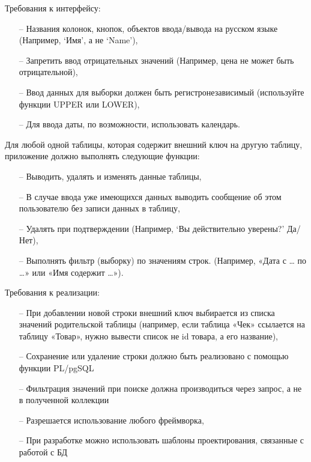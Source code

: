 \documentclass[a4paper,14pt]{extarticle}
\begin{document}
  Требования к интерфейсу:
  \begin{itemize}
    \item[--] Названия колонок, кнопок, объектов ввода/вывода на русском языке (Например, ‘Имя’, а не ‘Name’),
    \item[--] Запретить ввод отрицательных значений (Например, цена не может быть отрицательной),
    \item[--] Ввод данных для выборки должен быть регистронезависимый (используйте функции UPPER или LOWER),
    \item[--] Для ввода даты, по возможности, использовать календарь.
  \end{itemize}

  Для любой одной таблицы, которая содержит внешний ключ на другую таблицу, приложение должно выполнять следующие функции:
  \begin{itemize}
    \item[--] Выводить, удалять и изменять данные таблицы,
    \item[--] В случае ввода уже имеющихся данных выводить сообщение об этом пользователю без записи данных в таблицу,
    \item[--] Удалять при подтверждении (Например, ‘Вы действительно уверены?’ Да/Нет),
    \item[--] Выполнять фильтр (выборку) по значениям строк. (Например, «Дата с … по …» или «Имя содержит …»).
  \end{itemize}

  Требования к реализации:
  \begin{itemize}
    \item[--] При добавлении новой строки внешний ключ выбирается из списка значений родительской таблицы (например, если таблица «Чек» ссылается на таблицу «Товар», нужно вывести список не id товара, а его название),
    \item[--] Сохранение или удаление строки должно быть реализовано с помощью функции PL/pgSQL
    \item[--] Фильтрация значений при поиске должна производиться через запрос, а не в полученной коллекции
    \item[--] Разрешается использование любого фреймворка,
    \item[--] При разработке можно использовать шаблоны проектирования, связанные с работой с БД
  \end{itemize}

  \pagebreak
\end{document}
